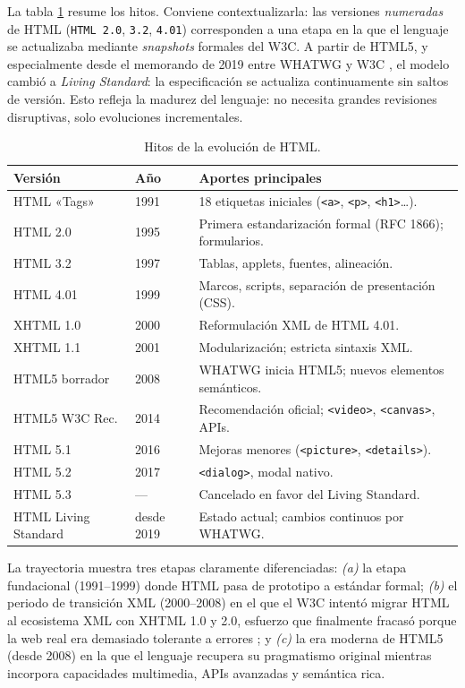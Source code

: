 \documentclass[11pt,a4paper,openany]{book}
\begin{document}
La tabla \ref{tab:evolucion-html} resume los hitos. Conviene
contextualizarla: las versiones \emph{numeradas} de HTML
(\texttt{HTML 2.0}, \texttt{3.2}, \texttt{4.01}) corresponden a una
etapa en la que el lenguaje se actualizaba mediante \emph{snapshots}
formales del W3C. A partir de HTML5, y especialmente desde el
memorando de 2019 entre WHATWG y W3C
\cite{whatwgw3c2019memorandum}, el modelo cambió a \emph{Living
Standard}: la especificación se actualiza continuamente sin saltos
de versión. Esto refleja la madurez del lenguaje: no necesita grandes
revisiones disruptivas, solo evoluciones incrementales.

\begin{table}[!htb]
\centering
\caption{Hitos de la evolución de HTML.}
\label{tab:evolucion-html}
\footnotesize
\begin{tabularx}{\textwidth}{lll}
\toprule
\textbf{Versión} & \textbf{Año} & \textbf{Aportes principales}\\
\midrule
HTML «Tags» & 1991 & 18 etiquetas iniciales (\texttt{<a>}, \texttt{<p>}, \texttt{<h1>}\dots).\\
HTML 2.0 & 1995 & Primera estandarización formal (RFC 1866); formularios.\\
HTML 3.2 & 1997 & Tablas, applets, fuentes, alineación.\\
HTML 4.01 & 1999 & Marcos, scripts, separación de presentación (CSS).\\
XHTML 1.0 & 2000 & Reformulación XML de HTML 4.01.\\
XHTML 1.1 & 2001 & Modularización; estricta sintaxis XML.\\
HTML5 borrador & 2008 & WHATWG inicia HTML5; nuevos elementos semánticos.\\
HTML5 W3C Rec. & 2014 & Recomendación oficial; \texttt{<video>}, \texttt{<canvas>}, APIs.\\
HTML 5.1 & 2016 & Mejoras menores (\texttt{<picture>}, \texttt{<details>}).\\
HTML 5.2 & 2017 & \texttt{<dialog>}, modal nativo.\\
HTML 5.3 & --- & Cancelado en favor del Living Standard.\\
HTML Living Standard & desde 2019 & Estado actual; cambios continuos por WHATWG.\\
\bottomrule
\end{tabularx}
\end{table}

La trayectoria muestra tres etapas claramente diferenciadas:
\emph{(a)} la etapa fundacional (1991--1999) donde HTML pasa de
prototipo a estándar formal; \emph{(b)} el periodo de transición
XML (2000--2008) en el que el W3C intentó migrar HTML al ecosistema
XML con XHTML 1.0 y 2.0, esfuerzo que finalmente fracasó porque la
web real era demasiado tolerante a errores
\cite{hickson2014html5}; y \emph{(c)} la era moderna de HTML5 (desde
2008) en la que el lenguaje recupera su pragmatismo original mientras
incorpora capacidades multimedia, APIs avanzadas y semántica rica.
\end{document}
